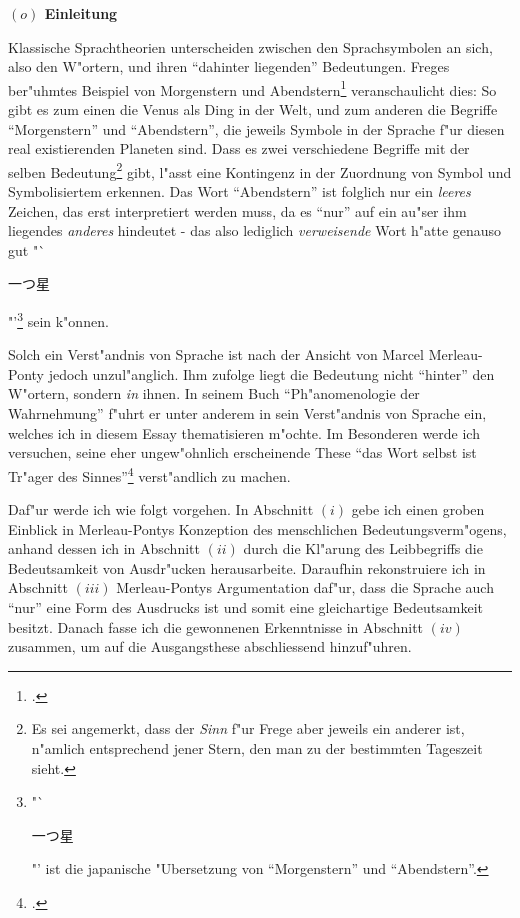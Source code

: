 \documentclass[a4paper, 12pt]{article}
\begin{document}
\begin{onehalfspace} 

\noindent\textbf{$(o)$ Einleitung}

\noindent Klassische Sprachtheorien unterscheiden zwischen den Sprachsymbolen an sich, also den W"ortern, und ihren "`dahinter liegenden"' Bedeutungen. Freges ber"uhmtes Beispiel von Morgenstern und Abendstern\footnote{\cite{sinnundbedeutung}.} veranschaulicht dies: So gibt es zum einen die Venus als Ding in der Welt, und zum anderen die Begriffe "`Morgenstern"' und "`Abendstern"', die jeweils Symbole in der Sprache f"ur diesen real existierenden Planeten sind. Dass es zwei verschiedene Begriffe mit der selben Bedeutung\footnote{Es sei angemerkt, dass der \emph{Sinn} f"ur Frege aber jeweils ein anderer ist, n"amlich entsprechend jener Stern, den man zu der bestimmten Tageszeit sieht.} gibt, l"asst eine Kontingenz in der Zuordnung von Symbol und Symbolisiertem erkennen. Das Wort "`Abendstern"' ist folglich nur ein \emph{leeres} Zeichen, das erst interpretiert werden muss, da es "`nur"' auf ein au"ser ihm liegendes \emph{anderes} hindeutet - das also lediglich \emph{verweisende} Wort h"atte genauso gut "`\begin{CJK}{UTF8}{min}一つ星\end{CJK}"'\footnote{"`\begin{CJK}{UTF8}{min}一つ星\end{CJK}"' ist die japanische "Ubersetzung von "`Morgenstern"' und "`Abendstern"'.} sein k"onnen.

Solch ein Verst"andnis von Sprache ist nach der Ansicht von Marcel Merleau-Ponty jedoch unzul"anglich. Ihm zufolge liegt die Bedeutung nicht "`hinter"' den W"ortern, sondern \emph{in} ihnen. In seinem Buch "`Ph"anomenologie der Wahrnehmung"' \citep{merleau1966phanomenologie} f"uhrt er unter anderem in sein Verst"andnis von Sprache ein, welches ich in diesem Essay thematisieren m"ochte. Im Besonderen werde ich versuchen, seine eher ungew"ohnlich erscheinende These "`das Wort selbst ist Tr"ager des Sinnes"'\footnote{\cite[S. 211]{merleau1966phanomenologie}.} verst"andlich zu machen.\newline

Daf"ur werde ich wie folgt vorgehen. In Abschnitt $(i)$ gebe ich einen groben Einblick in Merleau-Pontys Konzeption des menschlichen Bedeutungsverm"ogens, anhand dessen ich in Abschnitt $(ii)$ durch die Kl"arung des Leibbegriffs die Bedeutsamkeit von Ausdr"ucken herausarbeite. Daraufhin rekonstruiere ich in Abschnitt $(iii)$ Merleau-Pontys Argumentation daf"ur, dass die Sprache auch "`nur"' eine Form des Ausdrucks ist und somit eine gleichartige Bedeutsamkeit besitzt. Danach fasse ich die gewonnenen Erkenntnisse in Abschnitt $(iv)$ zusammen, um auf die Ausgangsthese abschliessend hinzuf"uhren.


\end{onehalfspace}
\end{document}
